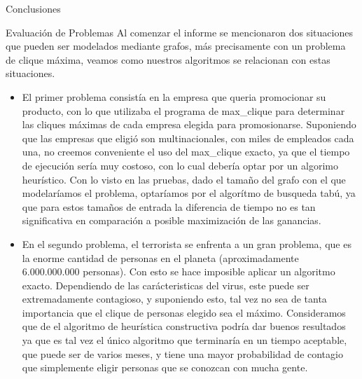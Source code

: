 \documentclass[12pt,titlepage]{article}
\newcommand{\tab}{\hspace*{2em}}
\begin{document}
\begin{section}{Conclusiones}
		\begin{subsection}{Evaluación de Problemas}
		\tab Al comenzar el informe se mencionaron dos situaciones que pueden ser modelados mediante grafos, más precisamente con un problema de clique máxima, veamos como nuestros algoritmos se relacionan con estas situaciones. 
			\begin{itemize}
			\item El primer problema consistía en la empresa que queria promocionar su producto, con lo que utilizaba el programa de max\_clique para determinar las cliques máximas de cada empresa elegida para promosionarse. Suponiendo que las empresas que eligió son multinacionales, con miles de empleados cada una, no creemos conveniente el uso del max\_clique exacto, ya que el tiempo de ejecución sería muy costoso, con lo cual debería optar por un algorimo heurístico. Con lo visto en las pruebas, dado el tamaño del grafo con el que modelaríamos el problema, optaríamos por el algorítmo de busqueda tabú, ya que para estos tamaños de entrada la diferencia de tiempo no es tan significativa en comparación a posible maximización de las ganancias.
			\item En el segundo problema, el terrorista se enfrenta a un gran problema, que es la enorme cantidad de personas en el planeta (aproximadamente 6.000.000.000 personas). Con esto se hace imposible aplicar un algoritmo exacto. Dependiendo de las carácteristicas del virus, este puede ser extremadamente contagioso, y suponiendo esto, tal vez no sea de tanta importancia que el clique de personas elegido sea el máximo. Consideramos que de el algoritmo de heurística constructiva podría dar buenos resultados ya que es tal vez el único algoritmo que terminaría en un tiempo aceptable, que puede ser de varios meses, y tiene una mayor probabilidad de contagio que simplemente eligir personas que se conozcan con mucha gente.
			\end{itemize}
		\end{subsection}
	
	\end{section}
	
\end{document}
